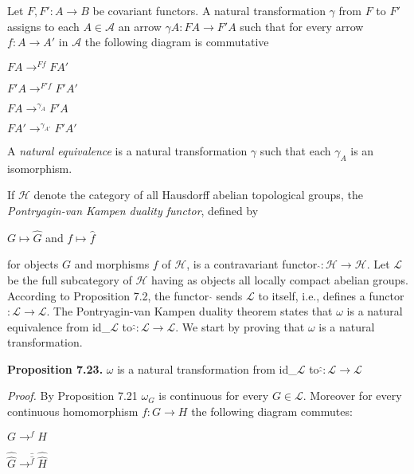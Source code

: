 \documentclass[12pt]{article}
\begin{document}
Let $F, F': A \to B$ be covariant functors. A natural transformation $\gamma$ from $F$ to $F'$ assigns to each $A \in \mathcal{A}$
an arrow $\gamma A : F A \to F'A$ such that for every arrow $f : A \to A'$ in $\mathcal{A}$ the following diagram is commutative



$FA \to^{Ff} FA'$ %

$F'A \to^{F'f} F'A'$ %


$FA \to^{\gamma_{A}} F'A$

$FA' \to^{\gamma_{A'}} F'A'$


    A \emph{natural equivalence} is a natural transformation $\gamma$ such that each $\gamma_A$ is an isomorphism.


    If $\mathcal{H}$ denote the category of all Hausdorff abelian topological groups, the \emph{Pontryagin-van Kampen duality
functor}, defined by


    $G \mapsto \hat{G}$ and $f \mapsto \hat{f}$


for objects $G$ and morphisms $f$ of $\mathcal{H}$, is a contravariant functor $\hat{}: \mathcal{H} \to \mathcal{H}$. Let $\mathcal{L}$ be the full subcategory of $\mathcal{H}$
having as objects all locally compact abelian groups. According to Proposition 7.2, the functor $\hat{}$ sends $\mathcal{L}$ to
itself, i.e., defines a functor $\hat{}: \mathcal{L} \to \mathcal{L}$. The Pontryagin-van Kampen duality theorem states that $\omega$ is a natural
equivalence from id_$\mathcal{L}$ to $\hat{\hat{}}: \mathcal{L} \to \mathcal{L}$. We start by proving that $\omega$ is a natural transformation.


\textbf{Proposition 7.23.} $\omega$ is a natural transformation from id_${\mathcal{L}}$ to $\hat{\hat{}}: \mathcal{L} \to \mathcal{L}$


\emph{Proof.} By Proposition 7.21 $\omega_G$ is continuous for every $G \in \mathcal{L}$. Moreover for every continuous homomorphism
$f : G \to H$ the following diagram commutes:



$G \to^{f} H$ %

$\hat{\hat{G}} \to^{\hat{\hat{f}}} \hat{\hat{H}}$ %
\end{document}
